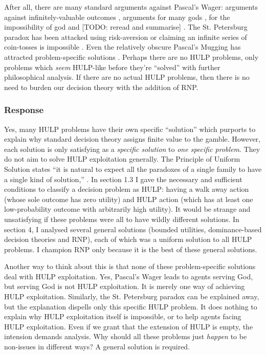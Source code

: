 \documentclass{article}
\begin{document}
After all, there are many standard arguments against Pascal's Wager: arguments against infinitely-valuable outcomes \citep{mcclennen1994pascal}, arguments for many gods \citep{saka2001pascal}, for the impossibility of god \citep{oppy1991rescher} and [TODO: reread and summarise] \citep{hajek2003waging}. The St. Petersburg paradox has been attacked using risk-aversion \citep{weirich1984st} or claiming an infinite series of coin-tosses is impossible \citep[pg. 154]{jeffrey1990logic}. Even the relatively obscure Pascal's Mugging has attracted problem-specific solutions \citep{baumann2009counting}. Perhaps there are no HULP problems, only problems which \textit{seem} HULP-like before they're ``solved'' with further philosophical analysis. If there are no actual HULP problems, then there is no need to burden our decision theory with the addition of RNP.

\subsubsection*{Response}

Yes, many HULP problems have their own specific ``solution'' which purports to explain why standard decision theory assigns finite value to the gamble. However, each solution is only satisfying as a \textit{specific solution} to \textit{one specific problem}. They do not aim to solve HULP exploitation generally. The Principle of Uniform Solution states ``it is natural to expect all the paradoxes of a single family to have a single kind of solution,'' \citep[pg. 32]{priest1994structure}. In section 1.3 I gave the necessary and sufficient conditions to classify a decision problem as HULP: having a walk away action (whose sole outcome has zero utility) and HULP action (which has at least one low-probability outcome with arbitrarily high utility). It would be strange and unsatisfying if these problems were all to have wildly different solutions. In section 4, I analysed several general solutions (bounded utilities, dominance-based decision theories and RNP), each of which was a uniform solution to all HULP problems. I champion RNP only because it is the best of these general solutions. 

Another way to think about this is that none of these problem-specific solutions deal with HULP exploitation. Yes, Pascal's Wager leads to agents serving God, but serving God is not HULP exploitation. It is merely one way of achieving HULP exploitation. Similarly, the St. Petersburg paradox can be explained away, but the explanation dispells only this specific HULP problem. It does nothing to explain why HULP exploitation itself is impossible, or to help agents facing HULP exploitation. Even if we grant that the extension of HULP is empty, the intension demands analysis. Why should all these problems just \textit{happen} to be non-issues in different ways? A general solution is required. 
\end{document}
